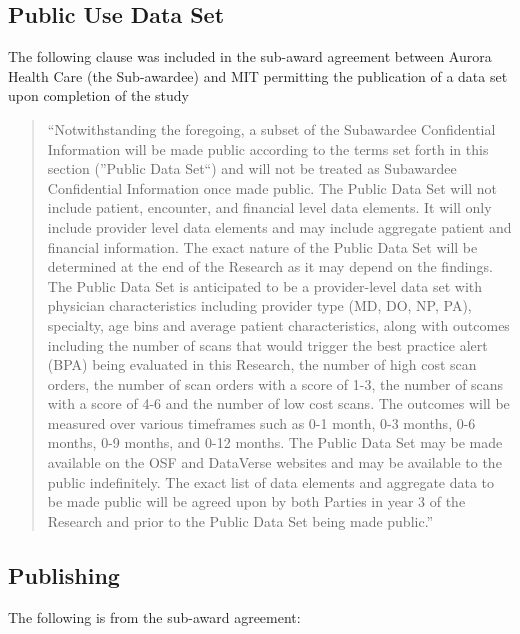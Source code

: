 \hypertarget{public-use-data-set}{%
\subsection*{Public Use Data Set}\label{public-use-data-set}}

The following clause was included in the sub-award agreement between Aurora Health Care (the Sub-awardee) and MIT permitting the publication of a data set upon completion of the study

\begin{quote}
``Notwithstanding the foregoing, a subset of the Subawardee Confidential Information will be made public according to the terms set forth in this section (''Public Data Set``) and will not be treated as Subawardee Confidential Information once made public. The Public Data Set will not include patient, encounter, and financial level data elements. It will only include provider level data elements and may include aggregate patient and financial information. The exact nature of the Public Data Set will be determined at the end of the Research as it may depend on the findings. The Public Data Set is anticipated to be a provider-level data set with physician characteristics including provider type (MD, DO, NP, PA), specialty, age bins and average patient characteristics, along with outcomes including the number of scans that would trigger the best practice alert (BPA) being evaluated in this Research, the number of high cost scan orders, the number of scan orders with a score of 1-3, the number of scans with a score of 4-6 and the number of low cost scans. The outcomes will be measured over various timeframes such as 0-1 month, 0-3 months, 0-6 months, 0-9 months, and 0-12 months. The Public Data Set may be made available on the OSF and DataVerse websites and may be available to the public indefinitely. The exact list of data elements and aggregate data to be made public will be agreed upon by both Parties in year 3 of the Research and prior to the Public Data Set being made public.''
\end{quote}

\hypertarget{publishing}{%
\subsection*{Publishing}\label{publishing}}

The following is from the sub-award agreement:

